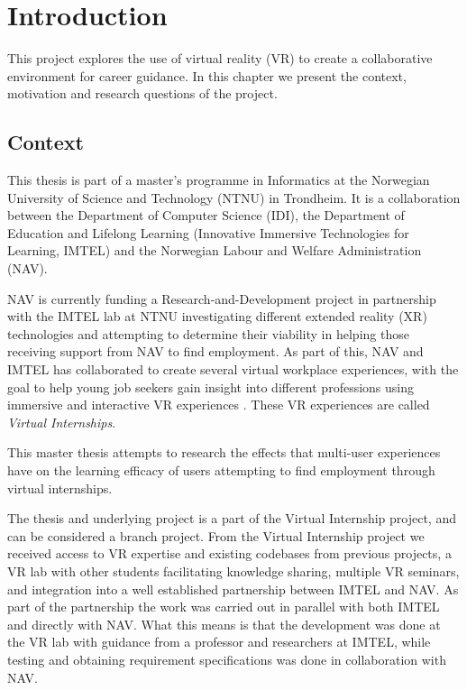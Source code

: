 
\chapter{Introduction}

This project explores the use of virtual reality (VR) to create a collaborative environment for career guidance. In this chapter we present the context, motivation and research questions of the project. 

\section{Context}
\label{section:context}
This thesis is part of a master's programme in Informatics at the Norwegian University of Science and Technology (NTNU) in Trondheim. It is a collaboration between the Department of Computer Science (IDI), the Department of Education and Lifelong Learning (Innovative Immersive Technologies for Learning, IMTEL) and the Norwegian Labour and Welfare Administration (NAV). 

NAV is currently funding a Research-and-Development project in partnership with the IMTEL lab at NTNU investigating different extended reality (XR) technologies and attempting to determine their viability in helping those receiving support from NAV to find employment. As part of this, NAV and IMTEL has collaborated to create several virtual workplace experiences, with the goal to help young job seekers gain insight into different professions using immersive and interactive VR experiences \cite{IMTELinternships}. These VR experiences are called \textit{Virtual Internships}. 

This master thesis attempts to research the effects that multi-user experiences have on the learning efficacy of users attempting to find employment through virtual internships. 

The thesis and underlying project is a part of the Virtual Internship project, and can be considered a branch project. From the Virtual Internship project we received access to VR expertise and existing codebases from previous projects, a VR lab with other students facilitating knowledge sharing, multiple VR seminars, and integration into a well established partnership between IMTEL and NAV.    
As part of the partnership the work was carried out in parallel with both IMTEL and directly with NAV. What this means is that the development was done at the VR lab with guidance from a professor and researchers at IMTEL, while testing and obtaining requirement specifications was done in collaboration with NAV.    


